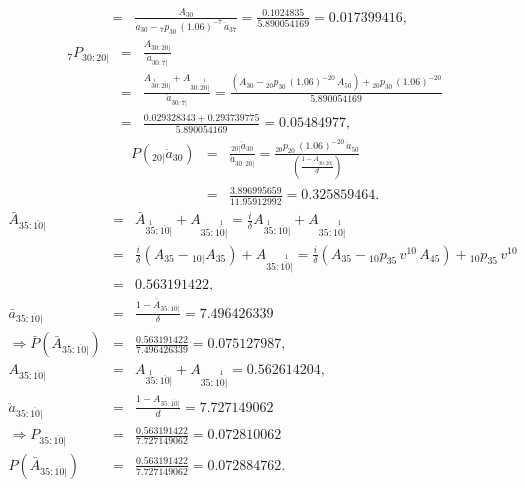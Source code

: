 \documentclass[11pt,fleqn,oneside]{book}
\begin{document}
\begin{enumerate}
\begin{eqnarray*}
&=& \frac{A_{30}}{\ddot{a}_{30} - {_7p_{30}}\,(1.06)^{-7}\,\ddot{a}_{37}} = \frac{0.1024835}{5.890054169} = 0.017399416,
\end{eqnarray*}
\begin{eqnarray*}
{_7P_{30:\overline{20}|}} &=& \frac{A_{30:\overline{20}|}}{\ddot{a}_{30:\overline{7}|}}\\
&=& \frac{A_{\stackrel{1}{30}:\overline{20}|} + A_{30:\stackrel{1}{\overline{20}|}}}{\ddot{a}_{30:\overline{7}|}}
 = \frac{\left(A_{30} -{_{20}p_{30}}\,(1.06)^{-20}\,A_{50}\right) + {_{20}p_{30}}\,(1.06)^{-20}}{5.890054169} \\
 &=& \frac{0.029328343 + 0.293739775}{5.890054169} = 0.05484977,
 \end{eqnarray*}
 \begin{eqnarray*}
 P\left({_{20|}\ddot{a}_{30}}\right) &=& \frac{_{20|}\ddot{a}_{30}}{\ddot{a}_{30:\overline{20}|}}
= \frac{{_{20}p_{20}}\,(1.06)^{-20}\,\ddot{a}_{50}}{\left(\frac{1 - A_{30:\overline{20}|}}{d}\right)}\\
&=& \frac{3.896995659}{11.95912992} = 0.325859464.
\end{eqnarray*}
\begin{eqnarray*}
\bar{A}_{35:\overline{10}|} &=& \bar{A}_{\stackrel{1}{35}:\overline{10}|} + A_{35:\stackrel{1}{\overline{10}|}} = \frac{i}{\delta} {A}_{\stackrel{1}{35}:\overline{10}|} + A_{35:\stackrel{1}{\overline{10}|}} \\
&=& \frac{i}{\delta} \left( {A}_{35} - {_{10|}A_{35}}\right) + A_{35:\stackrel{1}{\overline{10}|}} = \frac{i}{\delta} \left( {A}_{35} - {_{10}p_{35}}\,v^{10}\,A_{45}\right) + {_{10}p_{35}}\,v^{10}\\
&=& 0.563191422,\\
\bar{a}_{35:\overline{10}|} &=& \frac{1 - \bar{A}_{35:\overline{10}|}}{\delta} = 7.496426339\\
\Rightarrow \bar{P}\left(\bar{A}_{35:\overline{10}|}\right) &=&  \frac{0.563191422}{7.496426339} = 0.075127987,\\
A_{35:\overline{10}|} &=& A_{\stackrel{1}{35}:\overline{10}|} + A_{35:\stackrel{1}{\overline{10}|}} = 0.562614204,\\
\ddot{a}_{35:\overline{10}|} &=& \frac{1 - A_{35:\overline{10}|}}{d} = 7.727149062\\
\Rightarrow P_{35:\overline{10}|} &=& \frac{0.563191422}{7.727149062} = 0.072810062\\
P\left(\bar{A}_{35:\overline{10}|}\right) &=& \frac{0.563191422}{7.727149062} = 0.072884762.
\end{eqnarray*}
\end{enumerate}
\normalsize
\end{document}
